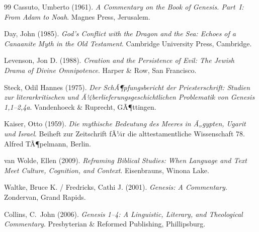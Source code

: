 ﻿\documentclass[a4paper,12pt]{article}
\theoremstyle{definition}
\begin{document}
\begin{thebibliography}{99}
	Cassuto, Umberto (1961).
	\textit{A Commentary on the Book of Genesis. Part~I: From Adam to Noah}.
	Magnes Press, Jerusalem.
	
	Day, John (1985).
	\textit{God's Conflict with the Dragon and the Sea:
		Echoes of a Canaanite Myth in the Old Testament}.
	Cambridge University Press, Cambridge.
	
	Levenson, Jon D. (1988).
	\textit{Creation and the Persistence of Evil:
		The Jewish Drama of Divine Omnipotence}.
	Harper \& Row, San Francisco.
	
	Steck, Odil Hannes (1975).
	\textit{Der SchÃ¶pfungsbericht der Priesterschrift:
		Studien zur literarkritischen und Ã¼berlieferungsgeschichtlichen Problematik
		von Genesis 1,1--2,4a}.
	Vandenhoeck \& Ruprecht, GÃ¶ttingen.
	
	Kaiser, Otto (1959).
	\textit{Die mythische Bedeutung des Meeres in Ã„gypten, Ugarit und Israel}.
	Beiheft zur Zeitschrift fÃ¼r die alttestamentliche Wissenschaft 78.
	Alfred TÃ¶pelmann, Berlin.
	
	van Wolde, Ellen (2009).
	\textit{Reframing Biblical Studies: When Language and Text Meet Culture,
		Cognition, and Context}.
	Eisenbrauns, Winona Lake.
	
	Waltke, Bruce K. / Fredricks, Cathi J. (2001).
	\textit{Genesis: A Commentary}.
	Zondervan, Grand Rapids.
	
	Collins, C.~John (2006).
	\textit{Genesis 1--4: A Linguistic, Literary, and Theological Commentary}.
	Presbyterian \& Reformed Publishing, Phillipsburg.
	
\end{thebibliography}
\end{document}
